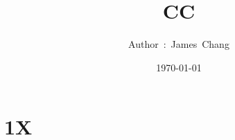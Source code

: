 

\title{CC}
\author{ {\Biohazard} \hspace{1.5mm} \hspace{1.5mm} Author\ :\ James\ Chang}
\date{\today}


\large

\tableofcontents

\chapter{1X}







